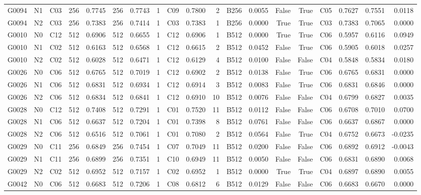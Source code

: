 \begin{tabular}{lllrrrrrlrrlrrrlrrr}
G0094 & N1 & C03 & 256 & 0.7745 & 256 & 0.7743 & 1 & C09 & 0.7800 & 2 & B256 & 0.0055 & False & True & C05 & 0.7627 & 0.7551 & 0.0118 \\
G0094 & N2 & C03 & 256 & 0.7383 & 256 & 0.7414 & 1 & C03 & 0.7383 & 1 & B256 & 0.0000 & True & True & C03 & 0.7383 & 0.7065 & 0.0000 \\
G0010 & N0 & C12 & 512 & 0.6906 & 512 & 0.6655 & 1 & C12 & 0.6906 & 1 & B512 & 0.0000 & True & True & C06 & 0.5957 & 0.6116 & 0.0949 \\
G0010 & N1 & C02 & 512 & 0.6163 & 512 & 0.6568 & 1 & C12 & 0.6615 & 2 & B512 & 0.0452 & False & True & C06 & 0.5905 & 0.6018 & 0.0257 \\
G0010 & N2 & C02 & 512 & 0.6028 & 512 & 0.6471 & 1 & C12 & 0.6129 & 4 & B512 & 0.0100 & False & False & C04 & 0.5848 & 0.5834 & 0.0180 \\
G0026 & N0 & C06 & 512 & 0.6765 & 512 & 0.7019 & 1 & C12 & 0.6902 & 2 & B512 & 0.0138 & False & True & C06 & 0.6765 & 0.6831 & 0.0000 \\
G0026 & N1 & C06 & 512 & 0.6831 & 512 & 0.6934 & 1 & C12 & 0.6914 & 3 & B512 & 0.0083 & False & True & C06 & 0.6831 & 0.6846 & 0.0000 \\
G0026 & N2 & C06 & 512 & 0.6834 & 512 & 0.6841 & 1 & C12 & 0.6910 & 10 & B512 & 0.0076 & False & False & C04 & 0.6799 & 0.6827 & 0.0035 \\
G0028 & N0 & C12 & 512 & 0.7408 & 512 & 0.7291 & 1 & C01 & 0.7520 & 11 & B512 & 0.0112 & False & False & C06 & 0.6708 & 0.7010 & 0.0700 \\
G0028 & N1 & C06 & 512 & 0.6637 & 512 & 0.7204 & 1 & C01 & 0.7398 & 8 & B512 & 0.0761 & False & False & C06 & 0.6637 & 0.6867 & 0.0000 \\
G0028 & N2 & C06 & 512 & 0.6516 & 512 & 0.7061 & 1 & C01 & 0.7080 & 2 & B512 & 0.0564 & False & True & C04 & 0.6752 & 0.6673 & -0.0235 \\
G0029 & N0 & C11 & 256 & 0.6849 & 256 & 0.7454 & 1 & C07 & 0.7049 & 11 & B512 & 0.0200 & False & False & C06 & 0.6892 & 0.6912 & -0.0043 \\
G0029 & N1 & C11 & 256 & 0.6899 & 256 & 0.7351 & 1 & C10 & 0.6949 & 11 & B512 & 0.0050 & False & False & C06 & 0.6831 & 0.6890 & 0.0068 \\
G0029 & N2 & C02 & 512 & 0.6952 & 512 & 0.7157 & 1 & C02 & 0.6952 & 1 & B512 & 0.0000 & True & True & C04 & 0.6897 & 0.6890 & 0.0055 \\
G0042 & N0 & C06 & 512 & 0.6683 & 512 & 0.7206 & 1 & C08 & 0.6812 & 6 & B512 & 0.0129 & False & False & C06 & 0.6683 & 0.6670 & 0.0000 \\

\end{tabular}
